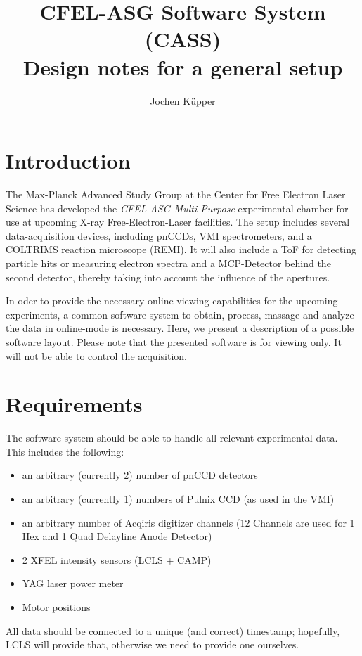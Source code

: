 \documentclass[11pt,a4paper,oneside]{article}
\begin{document}
\title{CFEL-ASG Software System (CASS) \\
   Design notes for a general setup}
\author{Jochen K\"{u}pper}
\maketitle

\section{Introduction}
\label{sec:introduction}

The Max-Planck Advanced Study Group at the Center for Free Electron Laser Science has developed the \emph{CFEL-ASG Multi Purpose} experimental chamber for use at upcoming X-ray Free-Electron-Laser facilities. The setup includes several data-acquisition devices, including pnCCDs, VMI spectrometers, and a COLTRIMS reaction microscope (REMI). It will also include a ToF for detecting particle hits or measuring electron spectra and a MCP-Detector behind the second detector, thereby taking into account the influence of the apertures.

In oder to provide the necessary online viewing capabilities for the upcoming experiments, a common software system to obtain, process, massage and analyze the data in online-mode is necessary. Here, we present a description of a possible software layout. Please note that the presented software is for viewing only. It will not be able to control the acquisition.



\section{Requirements}
\label{sec:requirements}

The software system should be able to handle all relevant experimental data. This includes the following:
\begin{itemize}
\item an arbitrary (currently 2) number of pnCCD detectors
\item an arbitrary (currently 1) numbers of Pulnix CCD (as used in the VMI)
\item an arbitrary number of Acqiris digitizer channels (12 Channels are used for 1 Hex and 1 Quad Delayline Anode Detector)
\item 2 XFEL intensity sensors (LCLS + CAMP)
\item YAG laser power meter
\item Motor positions
\end{itemize}
All data should be connected to a unique (and correct) timestamp; hopefully, LCLS will provide that, otherwise we need to provide one ourselves.
\end{document}
